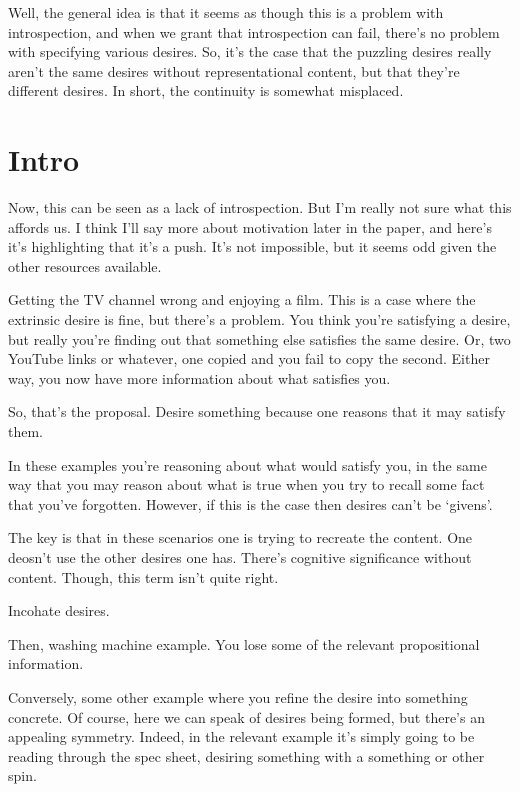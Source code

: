 \documentclass[10pt]{article}
\begin{document}
{\color{blue} Well, the general idea is that it seems as though this is a problem with introspection, and when we grant that introspection can fail, there's no problem with specifying various desires.
  So, it's the case that the puzzling desires really aren't the same desires without representational content, but that they're different desires.
  In short, the continuity is somewhat misplaced.}



\section{Intro}
\label{sec:intro}

Now, this can be seen as a lack of introspection.
But I'm really not sure what this affords us.
I think I'll say more about motivation later in the paper, and here's it's highlighting that it's a push.
It's not impossible, but it seems odd given the other resources available.


Getting the TV channel wrong and enjoying a film.
This is a case where the extrinsic desire is fine, but there's a problem.
You think you're satisfying a desire, but really you're finding out that something else satisfies the same desire.
Or, two YouTube links or whatever, one copied and you fail to copy the second.
Either way, you now have more information about what satisfies you.

So, that's the proposal.
Desire something because one reasons that it may satisfy them.

In these examples you're reasoning about what would satisfy you, in the same way that you may reason about what is true when you try to recall some fact that you've forgotten.
However, if this is the case then desires can't be `givens'.

The key is that in these scenarios one is trying to recreate the content.
One deosn't use the other desires one has.
There's cognitive significance without content.
Though, this term isn't quite right.

Incohate desires.

Then, washing machine example.
You lose some of the relevant propositional information.

Conversely, some other example where you refine the desire into something concrete.
Of course, here we can speak of desires being formed, but there's an appealing symmetry.
Indeed, in the relevant example it's simply going to be reading through the spec sheet, desiring something with a something or other spin.
\end{document}
